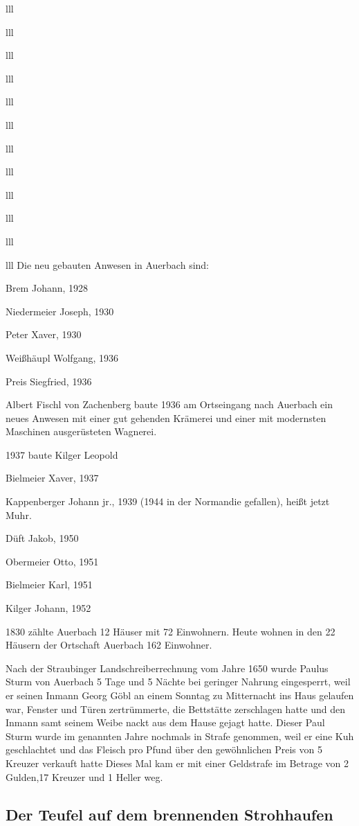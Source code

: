 \documentclass[12pt,a4pager]{book}
\begin{document}
\begin{tabuluar}{lll}
\begin{tabuluar}{lll}
\begin{tabuluar}{lll}
\begin{tabuluar}{lll}
\begin{tabuluar}{lll}
\begin{tabuluar}{lll}
\begin{tabuluar}{lll}
\begin{tabuluar}{lll}
\begin{tabuluar}{lll}
\begin{tabuluar}{lll}
\begin{tabuluar}{lll}
\begin{tabuluar}{lll}
Die neu gebauten Anwesen in Auerbach sind:

Brem Johann, 1928

Niedermeier Joseph, 1930

Peter Xaver, 1930

Weißhäupl Wolfgang, 1936

Preis Siegfried, 1936

Albert Fischl von Zachenberg baute 1936 am Ortseingang nach Auerbach ein neues
Anwesen mit einer gut gehenden Krämerei und einer mit modernsten Maschinen
ausgerüsteten Wagnerei.

1937 baute Kilger Leopold

Bielmeier Xaver, 1937

Kappenberger Johann jr., 1939 (1944 in der Normandie gefallen), heißt jetzt
Muhr.

Düft Jakob, 1950

Obermeier Otto, 1951

Bielmeier Karl, 1951

Kilger Johann, 1952

1830 zählte Auerbach 12 Häuser mit 72 Einwohnern. Heute wohnen in den 22 Häusern
der Ortschaft Auerbach 162 Einwohner.

Nach der Straubinger Landschreiberrechnung vom Jahre 1650 wurde Paulus Sturm von
Auerbach 5 Tage und 5 Nächte bei geringer Nahrung eingesperrt, weil er seinen
Inmann Georg Göbl an einem Sonntag zu Mitternacht ins Haus gelaufen war, Fenster
und Türen zertrümmerte, die Bettstätte zerschlagen hatte und den Inmann samt
seinem Weibe nackt aus dem Hause gejagt hatte. Dieser Paul Sturm wurde im
genannten Jahre nochmals in Strafe genommen, weil er eine Kuh geschlachtet und
das Fleisch pro Pfund über den gewöhnlichen Preis von 5 Kreuzer verkauft hatte
Dieses Mal kam er mit einer Geldstrafe im Betrage von 2 Gulden,17 Kreuzer und 1
Heller weg.

\subsection{Der Teufel auf dem brennenden Strohhaufen}


\end{tabuluar}
\end{tabuluar}
\end{tabuluar}
\end{tabuluar}
\end{tabuluar}
\end{tabuluar}
\end{tabuluar}
\end{tabuluar}
\end{tabuluar}
\end{tabuluar}
\end{tabuluar}
\end{tabuluar}
\end{document}
